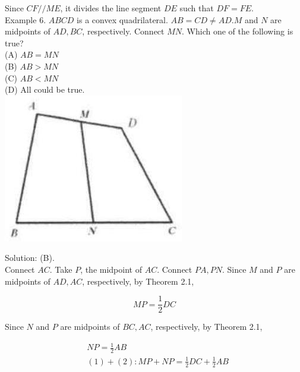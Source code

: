 \documentclass[10pt]{article}
\begin{document}
Since \(C F / / M E\), it divides the line segment \(D E\) such that \(D F=F E\).\\
Example 6. \(A B C D\) is a convex quadrilateral. \(A B=C D \neq A D . M\) and \(N\) are midpoints of \(A D, B C\), respectively. Connect \(M N\). Which one of the following is true?\\
(A) \(A B=M N\)\\
(B) \(A B>M N\)\\
(C) \(A B<M N\)\\
(D) All could be true.\\
\includegraphics[max width=\textwidth, center]{2025_04_17_97bc1f7e44d93c271a88g-038}

Solution: (B).\\
Connect \(A C\). Take \(P\), the midpoint of \(A C\). Connect \(P A, P N\). Since \(M\) and \(P\) are midpoints of \(A D, A C\), respectively, by Theorem 2.1,

\[
M P=\frac{1}{2} D C
\]

Since \(N\) and \(P\) are midpoints of \(B C, A C\), respectively, by Theorem 2.1,

\[
\begin{aligned}
& N P=\frac{1}{2} A B \\
& (1)+(2): M P+N P=\frac{1}{2} D C+\frac{1}{2} A B
\end{aligned}
\]
\end{document}
